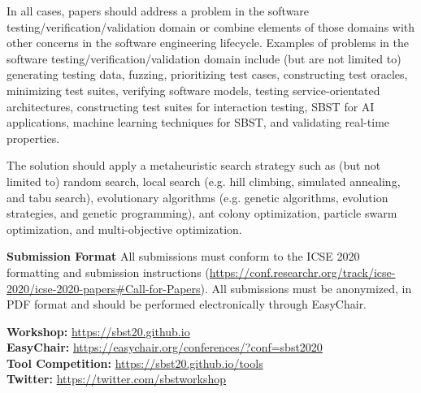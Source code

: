 \documentclass[10pt,conference]{IEEEtran}
\begin{document}
\smallskip \noindent In all cases, papers should address a problem in
the software testing/verification/validation domain or combine
elements of those domains with other concerns in the software
engineering lifecycle. Examples of problems in the software
testing/verification/validation domain include (but are not limited
to) generating testing data, fuzzing, prioritizing test cases, constructing
test oracles, minimizing test suites, verifying software models,
testing service-orientated architectures, constructing test suites for
interaction testing, SBST for AI applications, machine learning techniques for SBST,
and validating real-time properties.

\smallskip \noindent The solution should apply a metaheuristic search
strategy such as (but not limited to) random search, local search
(e.g. hill climbing, simulated annealing, and tabu search),
evolutionary algorithms (e.g. genetic algorithms, evolution
strategies, and genetic programming), ant colony optimization, 
particle swarm optimization, and multi-objective optimization.

\smallskip\noindent\textbf{Submission Format}
\noindent All submissions must conform to the ICSE 2020 formatting and
submission instructions
(\href{https://tinyurl.com/t6hp5me}{https://conf.researchr.org/track/icse-2020/icse-2020-papers\#Call-for-Papers}). All
submissions must be anonymized, in PDF format and should be performed
electronically through EasyChair.

\smallskip \noindent \textbf{Workshop:} \url{https://sbst20.github.io}\\
\textbf{EasyChair:} \url{https://easychair.org/conferences/?conf=sbst2020}\\
\textbf{Tool Competition:} \url{https://sbst20.github.io/tools}\\
\textbf{Twitter:} \url{https://twitter.com/sbstworkshop}

\end{document}
